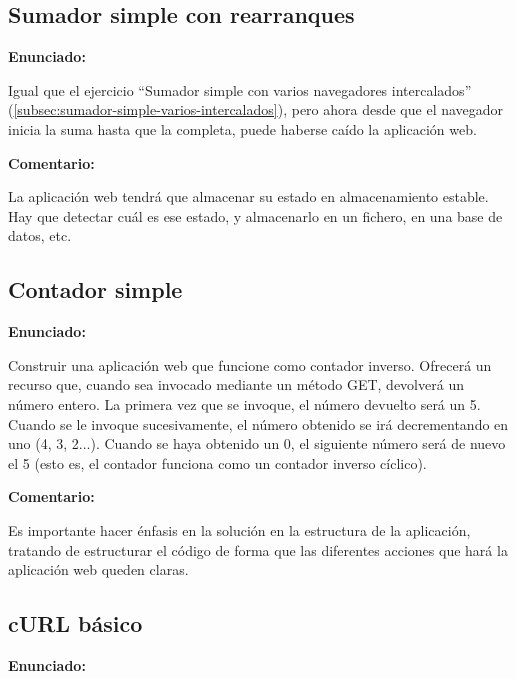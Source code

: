 \subsection{Sumador simple con rearranques}
\label{subsec:sumador-simple-rearranques}

\textbf{Enunciado:}

Igual que el ejercicio ``Sumador simple con varios navegadores intercalados'' (\ref{subsec:sumador-simple-varios-intercalados}), pero ahora desde que el navegador inicia la suma hasta que la completa, puede haberse caído la aplicación web.

\textbf{Comentario:}

La aplicación web tendrá que  almacenar su estado en almacenamiento estable. Hay que detectar cuál es ese estado, y almacenarlo en  un fichero, en  una base de datos, etc.


\subsection{Contador simple}
\label{subsec:contador-simple}

\textbf{Enunciado:}

Construir una aplicación web que funcione como contador inverso. Ofrecerá un recurso que, cuando sea invocado mediante un método GET, devolverá un número entero. La primera vez que se invoque, el número devuelto será un 5. Cuando se le invoque sucesivamente, el número obtenido se irá decrementando en uno (4, 3, 2...). Cuando se haya obtenido un 0, el siguiente número será de nuevo el 5 (esto es, el contador funciona como un contador inverso cíclico).

\textbf{Comentario:}

Es importante hacer énfasis en la solución en la estructura de la aplicación, tratando de estructurar el código de forma que las diferentes acciones que hará la aplicación web queden claras.

\subsection{cURL básico}
\label{subsec:curl-basico}

\textbf{Enunciado:}

